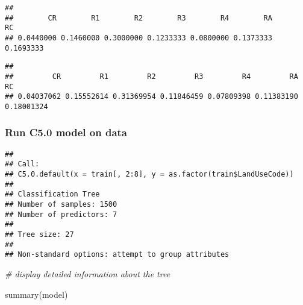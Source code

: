 \documentclass[
]{article}
\newenvironment{Shaded}{\begin{snugshade}}{\end{snugshade}}
\newcommand{\AttributeTok}[1]{\textcolor[rgb]{0.77,0.63,0.00}{#1}}
\newcommand{\CommentTok}[1]{\textcolor[rgb]{0.56,0.35,0.01}{\textit{#1}}}
\newcommand{\DecValTok}[1]{\textcolor[rgb]{0.00,0.00,0.81}{#1}}
\newcommand{\FunctionTok}[1]{\textcolor[rgb]{0.00,0.00,0.00}{#1}}
\newcommand{\NormalTok}[1]{#1}
\newcommand{\OtherTok}[1]{\textcolor[rgb]{0.56,0.35,0.01}{#1}}
\newcommand{\SpecialCharTok}[1]{\textcolor[rgb]{0.00,0.00,0.00}{#1}}
\begin{document}
\begin{verbatim}
## 
##        CR        R1        R2        R3        R4        RA        RC 
## 0.0440000 0.1460000 0.3000000 0.1233333 0.0800000 0.1373333 0.1693333
\end{verbatim}

\begin{Shaded}
\end{Shaded}

\begin{verbatim}
## 
##         CR         R1         R2         R3         R4         RA         RC 
## 0.04037062 0.15552614 0.31369954 0.11846459 0.07809398 0.11383190 0.18001324
\end{verbatim}

\hypertarget{run-c5.0-model-on-data}{%
\subsubsection{Run C5.0 model on data}\label{run-c5.0-model-on-data}}

\begin{Shaded}
\end{Shaded}

\begin{verbatim}
## 
## Call:
## C5.0.default(x = train[, 2:8], y = as.factor(train$LandUseCode))
## 
## Classification Tree
## Number of samples: 1500 
## Number of predictors: 7 
## 
## Tree size: 27 
## 
## Non-standard options: attempt to group attributes
\end{verbatim}

\begin{Shaded}
\begin{Highlighting}[]
\CommentTok{\# display detailed information about the tree}

\FunctionTok{summary}\NormalTok{(model)}
\end{Highlighting}
\end{Shaded}
\end{document}
